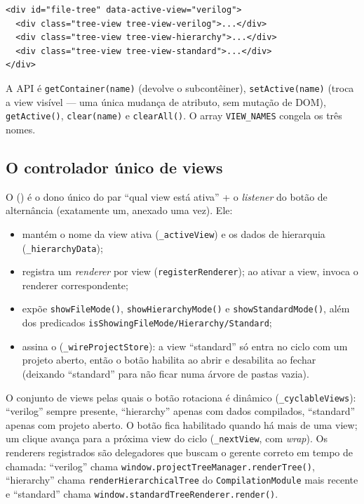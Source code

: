 \begin{lstlisting}
<div id="file-tree" data-active-view="verilog">
  <div class="tree-view tree-view-verilog">...</div>
  <div class="tree-view tree-view-hierarchy">...</div>
  <div class="tree-view tree-view-standard">...</div>
</div>
\end{lstlisting}

A API é \lstinline|getContainer(name)| (devolve o subcontêiner), \lstinline|setActive(name)|
(troca a view visível — uma única mudança de atributo, sem mutação de DOM),
\lstinline|getActive()|, \lstinline|clear(name)| e \lstinline|clearAll()|. O
array \lstinline|VIEW_NAMES| congela os três nomes.

\subsection{O controlador único de views}

O  ()
é o dono único do par \enquote{qual view está ativa} + o \emph{listener} do
botão de alternância (exatamente um, anexado uma vez). Ele:

\begin{itemize}[leftmargin=1.6em]
  \item mantém o nome da view ativa (\lstinline|_activeView|) e os dados de
    hierarquia (\lstinline|_hierarchyData|);
  \item registra um \emph{renderer} por view (\lstinline|registerRenderer|); ao
    ativar a view, invoca o renderer correspondente;
  \item expõe \lstinline|showFileMode()|, \lstinline|showHierarchyMode()| e
    \lstinline|showStandardMode()|, além dos predicados
    \lstinline|isShowingFileMode/Hierarchy/Standard|;
  \item assina o  (\lstinline|_wireProjectStore|): a view
    \enquote{standard} só entra no ciclo com um projeto aberto, então o botão
    habilita ao abrir e desabilita ao fechar (deixando \enquote{standard} para
    não ficar numa árvore de pastas vazia).
\end{itemize}

O conjunto de views pelas quais o botão rotaciona é dinâmico
(\lstinline|_cyclableViews|): \enquote{verilog} sempre presente, \enquote{hierarchy}
apenas com dados compilados, \enquote{standard} apenas com projeto aberto. O
botão fica habilitado quando há mais de uma view; um clique avança para a
próxima view do ciclo (\lstinline|_nextView|, com \emph{wrap}). Os renderers
registrados são delegadores que buscam o gerente correto em tempo de chamada:
\enquote{verilog} chama \lstinline|window.projectTreeManager.renderTree()|,
\enquote{hierarchy} chama \lstinline|renderHierarchicalTree| do
\lstinline|CompilationModule| mais recente e \enquote{standard} chama
\lstinline|window.standardTreeRenderer.render()|.

